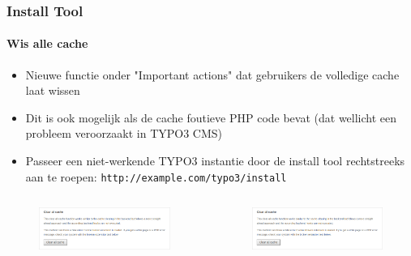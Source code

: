 
\begin{frame}[fragile]
	\frametitle{Install Tool}
	\framesubtitle{Wis alle cache}

	\begin{itemize}
		\item Nieuwe functie onder "Important actions" dat gebruikers de volledige cache laat wissen
		\item Dit is ook mogelijk als de cache foutieve PHP code bevat\newline
			(dat wellicht een probleem veroorzaakt in TYPO3 CMS)
		\item Passeer een niet-werkende TYPO3 instantie door de install tool rechtstreeks aan te roepen: \texttt{http://example.com/typo3/install}
	\end{itemize}

	\begin{columns}[T]
		\begin{column}{.4\textwidth}
			\begin{figure}\vspace*{-0.4cm}
				\includegraphics[width=0.6\linewidth]{Images/InstallTool/ClearAllCache.png}
			\end{figure}
		\end{column}
		\begin{column}{.6\textwidth}
			\begin{figure}
				\includegraphics[width=0.6\linewidth]{Images/InstallTool/ClearAllCache.png}
			\end{figure}
		\end{column}
	\end{columns}

\end{frame}

